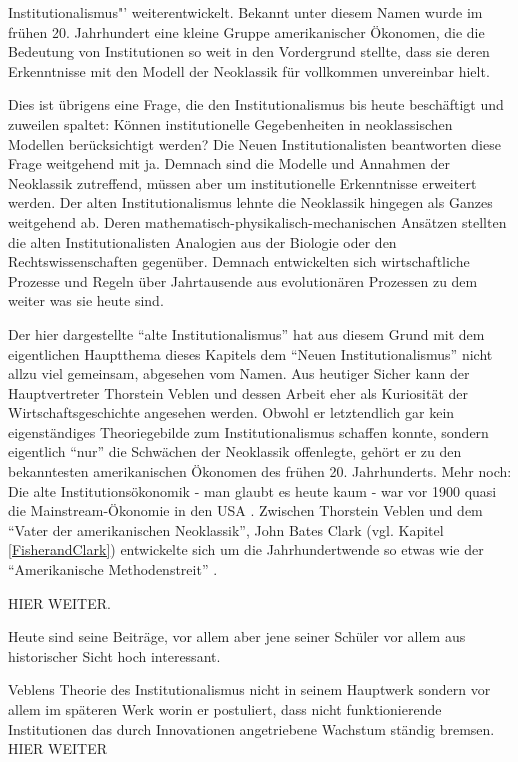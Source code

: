 Institutionalismus"' weiterentwickelt. Bekannt unter diesem Namen wurde im frühen 20. Jahrhundert eine kleine Gruppe amerikanischer Ökonomen, die die Bedeutung von Institutionen so weit in den Vordergrund stellte, dass sie deren Erkenntnisse mit den Modell der Neoklassik für vollkommen unvereinbar hielt. 

Dies ist übrigens eine Frage, die den Institutionalismus bis heute beschäftigt und zuweilen spaltet: Können institutionelle Gegebenheiten in neoklassischen Modellen berücksichtigt werden? Die Neuen Institutionalisten beantworten diese Frage weitgehend mit ja. Demnach sind die Modelle und Annahmen der Neoklassik zutreffend, müssen aber um institutionelle Erkenntnisse erweitert werden. Der alten Institutionalismus lehnte die Neoklassik hingegen als Ganzes weitgehend ab. Deren mathematisch-physikalisch-mechanischen Ansätzen stellten die alten Institutionalisten Analogien aus der Biologie oder den Rechtswissenschaften gegenüber. Demnach entwickelten sich wirtschaftliche Prozesse und Regeln über Jahrtausende aus evolutionären Prozessen zu dem weiter was sie heute sind. 

Der hier dargestellte "`alte Institutionalismus"' hat aus diesem Grund mit dem eigentlichen Hauptthema dieses Kapitels dem "`Neuen Institutionalismus"' nicht allzu viel gemeinsam, abgesehen vom Namen. Aus heutiger Sicher kann der Hauptvertreter Thorstein Veblen und dessen Arbeit eher als Kuriosität der Wirtschaftsgeschichte angesehen werden. Obwohl er letztendlich gar kein eigenständiges Theoriegebilde zum Institutionalismus schaffen konnte, sondern eigentlich "`nur"' die Schwächen der Neoklassik offenlegte, gehört er zu den bekanntesten amerikanischen Ökonomen des frühen 20. Jahrhunderts. Mehr noch: Die alte Institutionsökonomik - man glaubt es heute kaum - war vor 1900 quasi die Mainstream-Ökonomie in den USA \parencite[S. 97]{Persky2000}. Zwischen Thorstein Veblen und dem "`Vater der amerikanischen Neoklassik"', John Bates Clark (vgl. Kapitel \ref{FisherandClark}) entwickelte sich um die Jahrhundertwende so etwas wie der "`Amerikanische Methodenstreit"' \parencite[S. 100]{Persky2000}. 


HIER WEITER.


Heute sind seine Beiträge, vor allem aber jene seiner Schüler vor allem aus historischer Sicht hoch interessant. 



Veblens Theorie des Institutionalismus nicht in seinem Hauptwerk sondern vor allem im späteren Werk \textcite{Veblen1914} worin er postuliert, dass nicht funktionierende Institutionen das durch Innovationen angetriebene Wachstum ständig bremsen.
HIER WEITER


